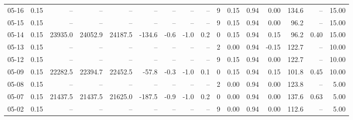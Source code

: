 \begin{threeparttable}
{\begin{tabular}{lrrrrrrrrrrrrrrr}
  05-16 &     0.15 &      -- &      -- &      -- &         -- &             -- &                       -- &                  -- &              9 &       0.15 &      0.94 &           0.00 &            134.6 &              -- &                  15.00 \\
  05-15 &     0.15 &      -- &      -- &      -- &         -- &             -- &                       -- &                  -- &              9 &       0.15 &      0.94 &           0.00 &             96.2 &              -- &                  15.00 \\
  05-14 &     0.15 & 23935.0 & 24052.9 & 24187.5 &     -134.6 &           -0.6 &                     -1.0 &                 0.2 &              0 &       0.15 &      0.94 &           0.15 &             96.2 &            0.40 &                  15.00 \\
  05-13 &     0.15 &      -- &      -- &      -- &         -- &             -- &                       -- &                  -- &              2 &       0.00 &      0.94 &          -0.15 &            122.7 &              -- &                  10.00 \\
  05-12 &     0.15 &      -- &      -- &      -- &         -- &             -- &                       -- &                  -- &              9 &       0.15 &      0.94 &           0.00 &            122.7 &              -- &                  10.00 \\
  05-09 &     0.15 & 22282.5 & 22394.7 & 22452.5 &      -57.8 &           -0.3 &                     -1.0 &                 0.1 &              0 &       0.15 &      0.94 &           0.15 &            101.8 &            0.45 &                  10.00 \\
  05-08 &     0.15 &      -- &      -- &      -- &         -- &             -- &                       -- &                  -- &              2 &       0.00 &      0.94 &           0.00 &            123.8 &              -- &                   5.00 \\
  05-07 &     0.15 & 21437.5 & 21437.5 & 21625.0 &     -187.5 &           -0.9 &                     -1.0 &                 0.2 &              0 &       0.00 &      0.94 &           0.00 &            137.6 &            0.63 &                   5.00 \\
  05-02 &     0.15 &      -- &      -- &      -- &         -- &             -- &                       -- &                  -- &              9 &       0.00 &      0.94 &           0.00 &            112.6 &              -- &                   5.00 \\

\end{tabular}}
\end{threeparttable}
